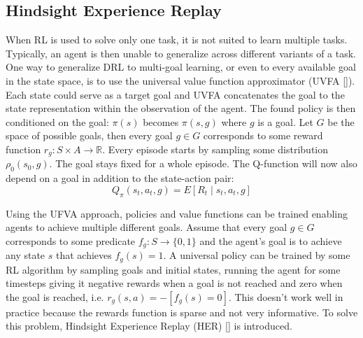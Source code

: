 \documentclass[conference]{IEEEtran}
\begin{document}
\subsection{Hindsight Experience Replay} \label{subsec:her}
When RL is used to solve only one task, it is not suited to learn multiple tasks. Typically, an agent is then unable to generalize across different variants of a task. One way to generalize DRL to multi-goal learning, or even to every available goal in the state space, is to use the universal value function approximator (UVFA [\cite{schaul2015universal}]). Each state could serve as a target goal and UVFA concatenates the goal to the state representation within the observation of the agent. The found policy is then conditioned on the goal: $\pi(s)$ becomes $\pi(s, g)$ where $g$ is a goal. Let $G$ be the space of possible goals, then every goal $g \in G$ corresponds to some reward function $r_g: S \times A \to \mathbb{R}$. Every episode starts by sampling some distribution $\rho_0(s_0, g)$. The goal stays fixed for a whole episode. The Q-function will now also depend on a goal in addition to the state-action pair:
\begin{equation*}
    Q_{\pi}(s_t, a_t, g) = E \left[R_t \mid s_t,a_t, g \right]
\end{equation*}

Using the UFVA approach, policies and value functions can be trained enabling agents to achieve multiple different goals. Assume that every goal $g \in G$ corresponds to some predicate $f_g : S \to \{0, 1\}$ and the agent's goal is to achieve any state $s$ that achieves $f_g(s) = 1$. A universal policy can be trained by some RL algorithm by sampling goals and initial states, running the agent for some timesteps giving it negative rewards when a goal is not reached and zero when the goal is reached, i.e. $r_g(s, a) = -[f_g(s) = 0]$. This doesn't work well in practice because the rewards function is sparse and not very informative. To solve this problem, Hindsight Experience Replay (HER) [\cite{andrychowicz2017hindsight}] is introduced.
\end{document}
